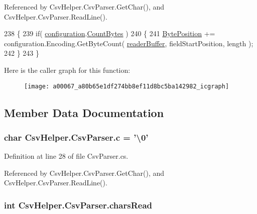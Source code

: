 Referenced by Csv\-Helper.\-Csv\-Parser.\-Get\-Char(), and Csv\-Helper.\-Csv\-Parser.\-Read\-Line().


\begin{DoxyCode}
238         \{
239             \textcolor{keywordflow}{if}( \hyperlink{a00067_aeb171813d1526839ccd41d60ab6483b2}{configuration}.\hyperlink{a00062_af774e3cb6d18788006deec71879f54a1}{CountBytes} )
240             \{
241                 \hyperlink{a00067_a6fd7255ce9ae33029aafcaab07205047}{BytePosition} += configuration.Encoding.GetByteCount( 
      \hyperlink{a00067_ad8b27f20be101a15ef390fcc37f8631b}{readerBuffer}, fieldStartPosition, length );
242             \}
243         \}
\end{DoxyCode}


Here is the caller graph for this function\-:
\nopagebreak
\begin{figure}[H]
\begin{center}
\leavevmode
\texttt{[image: a00067\_a80b65e1df274bb8ef11d8bc5ba142982\_icgraph]}
\end{center}
\end{figure}




\subsection{Member Data Documentation}
\hypertarget{a00067_ae56cb79868b308d55a44c4c4b7cd22d1}{
\subsubsection[{c}]{\setlength{\rightskip}{0pt plus 5cm}char Csv\-Helper.\-Csv\-Parser.\-c = '\textbackslash{}0'\hspace{0.3cm}{\ttfamily [private]}}}\label{a00067_ae56cb79868b308d55a44c4c4b7cd22d1}


Definition at line 28 of file Csv\-Parser.\-cs.



Referenced by Csv\-Helper.\-Csv\-Parser.\-Get\-Char(), and Csv\-Helper.\-Csv\-Parser.\-Read\-Line().

\hypertarget{a00067_a9300effd525a71c2a377bde2586da9ae}{
\subsubsection[{chars\-Read}]{\setlength{\rightskip}{0pt plus 5cm}int Csv\-Helper.\-Csv\-Parser.\-chars\-Read\hspace{0.3cm}{\ttfamily [private]}}}\label{a00067_a9300effd525a71c2a377bde2586da9ae}


